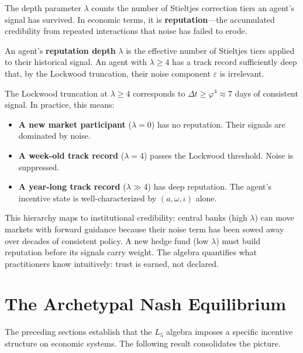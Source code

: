 The depth parameter $\lambda$ counts the number of Stieltjes correction tiers an agent's signal has survived. In economic terms, it is \textbf{reputation}---the accumulated credibility from repeated interactions that noise has failed to erode.

\begin{definition}
An agent's \textbf{reputation depth} $\lambda$ is the effective number of Stieltjes tiers applied to their historical signal. An agent with $\lambda \geq 4$ has a track record sufficiently deep that, by the Lockwood truncation, their noise component $\varepsilon$ is irrelevant.
\end{definition}

The Lockwood truncation at $\lambda \geq 4$ corresponds to $\Delta t \geq \varphi^4 \approx 7$ days of consistent signal. In practice, this means:
\begin{itemize}[noitemsep]
    \item \textbf{A new market participant} ($\lambda = 0$) has no reputation. Their signals are dominated by noise.
    \item \textbf{A week-old track record} ($\lambda = 4$) passes the Lockwood threshold. Noise is suppressed.
    \item \textbf{A year-long track record} ($\lambda \gg 4$) has deep reputation. The agent's incentive state is well-characterized by $(a, \omega, \iota)$ alone.
\end{itemize}

This hierarchy maps to institutional credibility: central banks (high $\lambda$) can move markets with forward guidance because their noise term has been sowed away over decades of consistent policy. A new hedge fund (low $\lambda$) must build reputation before its signals carry weight. The algebra quantifies what practitioners know intuitively: trust is earned, not declared.

\section{The Archetypal Nash Equilibrium}

The preceding sections establish that the $L_5$ algebra imposes a specific incentive structure on economic systems. The following result consolidates the picture.

